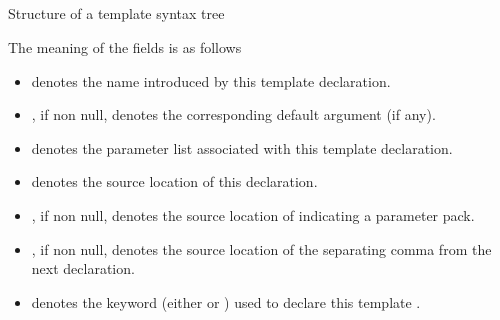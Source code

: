 

\subsection{}
\label{sec:ifc:SyntaxSort:TemplateTemplateParameter}

\begin{Structure}
	\caption{Structure of a template  syntax tree}
	\label{fig:ifc:SyntaxSort:TemplateTemplateParameter}
\end{Structure}
%
The meaning of the fields is as follows
\begin{itemize}
	\item {} denotes the name introduced by this template  declaration.
	\item {}, if non null, denotes the corresponding default argument (if any).
	\item {} denotes the parameter list associated with this template  declaration.
	\item {} denotes the source location of this declaration.
	\item {}, if non null, denotes the source location of  indicating a parameter pack.
	\item {}, if non null, denotes the source location of the separating comma from the next  declaration.
	\item {} denotes the keyword (either  or ) used to declare this template .
\end{itemize}


\subsection{}
\label{sec:ifc:SyntaxSort:TypeTemplateArgument}

